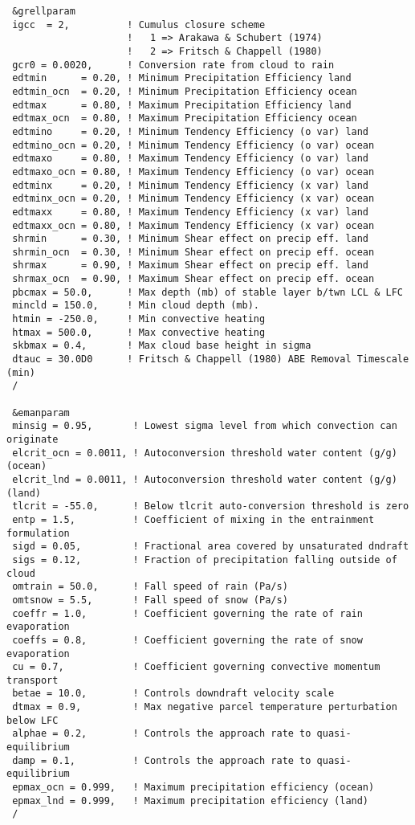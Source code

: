 {\footnotesize
\begin{Verbatim}
 &grellparam
 igcc  = 2,          ! Cumulus closure scheme
                     !   1 => Arakawa & Schubert (1974)
                     !   2 => Fritsch & Chappell (1980)
 gcr0 = 0.0020,      ! Conversion rate from cloud to rain
 edtmin      = 0.20, ! Minimum Precipitation Efficiency land
 edtmin_ocn  = 0.20, ! Minimum Precipitation Efficiency ocean
 edtmax      = 0.80, ! Maximum Precipitation Efficiency land
 edtmax_ocn  = 0.80, ! Maximum Precipitation Efficiency ocean
 edtmino     = 0.20, ! Minimum Tendency Efficiency (o var) land
 edtmino_ocn = 0.20, ! Minimum Tendency Efficiency (o var) ocean
 edtmaxo     = 0.80, ! Maximum Tendency Efficiency (o var) land
 edtmaxo_ocn = 0.80, ! Maximum Tendency Efficiency (o var) ocean
 edtminx     = 0.20, ! Minimum Tendency Efficiency (x var) land
 edtminx_ocn = 0.20, ! Minimum Tendency Efficiency (x var) ocean
 edtmaxx     = 0.80, ! Maximum Tendency Efficiency (x var) land
 edtmaxx_ocn = 0.80, ! Maximum Tendency Efficiency (x var) ocean
 shrmin      = 0.30, ! Minimum Shear effect on precip eff. land
 shrmin_ocn  = 0.30, ! Minimum Shear effect on precip eff. ocean
 shrmax      = 0.90, ! Maximum Shear effect on precip eff. land
 shrmax_ocn  = 0.90, ! Maximum Shear effect on precip eff. ocean
 pbcmax = 50.0,      ! Max depth (mb) of stable layer b/twn LCL & LFC
 mincld = 150.0,     ! Min cloud depth (mb).
 htmin = -250.0,     ! Min convective heating
 htmax = 500.0,      ! Max convective heating
 skbmax = 0.4,       ! Max cloud base height in sigma
 dtauc = 30.0D0      ! Fritsch & Chappell (1980) ABE Removal Timescale (min)
 /

 &emanparam
 minsig = 0.95,       ! Lowest sigma level from which convection can originate
 elcrit_ocn = 0.0011, ! Autoconversion threshold water content (g/g) (ocean)
 elcrit_lnd = 0.0011, ! Autoconversion threshold water content (g/g) (land)
 tlcrit = -55.0,      ! Below tlcrit auto-conversion threshold is zero
 entp = 1.5,          ! Coefficient of mixing in the entrainment formulation
 sigd = 0.05,         ! Fractional area covered by unsaturated dndraft
 sigs = 0.12,         ! Fraction of precipitation falling outside of cloud
 omtrain = 50.0,      ! Fall speed of rain (Pa/s)
 omtsnow = 5.5,       ! Fall speed of snow (Pa/s)
 coeffr = 1.0,        ! Coefficient governing the rate of rain evaporation
 coeffs = 0.8,        ! Coefficient governing the rate of snow evaporation
 cu = 0.7,            ! Coefficient governing convective momentum transport
 betae = 10.0,        ! Controls downdraft velocity scale
 dtmax = 0.9,         ! Max negative parcel temperature perturbation below LFC
 alphae = 0.2,        ! Controls the approach rate to quasi-equilibrium
 damp = 0.1,          ! Controls the approach rate to quasi-equilibrium
 epmax_ocn = 0.999,   ! Maximum precipitation efficiency (ocean)
 epmax_lnd = 0.999,   ! Maximum precipitation efficiency (land)
 /


\end{Verbatim}}
